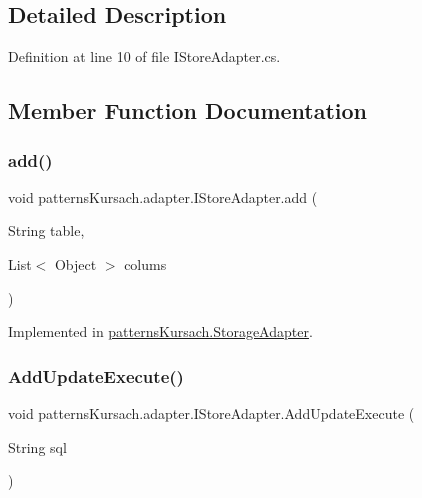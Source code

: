 \subsection{Detailed Description}


Definition at line 10 of file I\+Store\+Adapter.\+cs.



\subsection{Member Function Documentation}
\mbox{\label{interfacepatterns_kursach_1_1adapter_1_1_i_store_adapter_a12816166876b9ddffa991a55d5e917c8}} 
\subsubsection{\texorpdfstring{add()}{add()}}
{\footnotesize\ttfamily void patterns\+Kursach.\+adapter.\+I\+Store\+Adapter.\+add (\begin{DoxyParamCaption}\item[{String}]{table,  }\item[{List$<$ Object $>$}]{colums }\end{DoxyParamCaption})}



Implemented in \mbox{\hyperlink{classpatterns_kursach_1_1_storage_adapter_a1a6b043621bfa53482563397597aa046}{patterns\+Kursach.\+Storage\+Adapter}}.

\mbox{\label{interfacepatterns_kursach_1_1adapter_1_1_i_store_adapter_ad1833d2efd297547ff34828468e914d2}} 
\subsubsection{\texorpdfstring{Add\+Update\+Execute()}{AddUpdateExecute()}}
{\footnotesize\ttfamily void patterns\+Kursach.\+adapter.\+I\+Store\+Adapter.\+Add\+Update\+Execute (\begin{DoxyParamCaption}\item[{String}]{sql }\end{DoxyParamCaption})}



